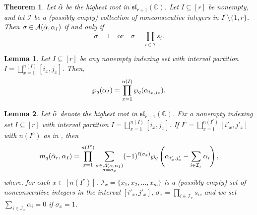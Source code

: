 \documentclass[10pt,a4paper]{amsart}
\newtheorem{lemma}{Lemma}
\newtheorem{theorem}{Theorem}
\newcommand{\hr}[0]{\Tilde{\alpha}}
\newcommand{\newmu}[0]{\alpha_I}
\newcommand{\qpartition}[1]{\wp_q\left(#1\right)}
\newcommand{\speclin}[0]{\mathfrak{sl}_{r+1}(\mathbb{C})}
\newcommand{\thealtset}[0]{\mathcal{A}(\hr,\newmu)}
\begin{document}
\begin{theorem}\label{thm:whats in the alt set} 
Let $\hr$ be the highest root in $\speclin$.
    Let $I\subseteq[r]$ be nonempty, and let $\mathcal{I}$ be a (possibly empty) collection of nonconsecutive integers in $I^c\setminus\{1,r\}$.     
    Then $\sigma\in\thealtset$ if and only if 
    \[\sigma=1 \quad \text{or} \quad \sigma=\prod_{i\in \mathcal{I}}s_i.\]
\end{theorem}

\begin{lemma}\label{lemma: split up partition function}
    Let $I\subseteq [r]$ be any nonempty indexing set with interval partition $I=\bigsqcup_{x=1}^{n(I)}[i_x,j_x]$. Then,
    \begin{equation}
        \wp_q(\alpha_I) = \prod_{x=1}^{n(I)}\wp_q(\alpha_{i_x,j_x}).\notag
    \end{equation}
\end{lemma}

\begin{lemma}\label{lemma: mu a sum of positive roots turns KWMF into a product}
    Let $\hr$ denote the highest root in $\speclin$. Fix a nonempty indexing set $I\subseteq [r]$ with interval partition $I=\bigsqcup_{x=1}^{n(I)}[i_x,j_x]$. If $I^c=  
    \bigsqcup_{x=1}^{n(I^c)}[i'_x,j'_x]$ with $n(I^c)$ as in , then 
    \begin{equation}\label{eq:KWMF into a product}
        m_q(\hr_r,\alpha_I)=\prod_{x=1}^{n(I^c)}\sum_{\substack{\sigma\in\mathcal{A}(\hr,\alpha_I) \\ \sigma=\sigma_x}}(-1)^{\ell(\sigma_x)}\qpartition{\alpha_{i'_x,j'_x}-\sum_{i\in\mathcal{I}_x}\alpha_i},
    \end{equation}
    where, for each $x\in [n(I^c)]$, $\mathcal{I}_x=\{x_1,x_2,\ldots,x_m\}$ is a (possibly empty) set of nonconsecutive integers in the interval $[i'_x,j'_x]$, $\sigma_x=\prod_{i\in \mathcal{I}_x}s_i$, and we set $\sum_{i\in\mathcal{I}_x}\alpha_i=0$ if $\sigma_x=1$.  
\end{lemma}
\end{document}
